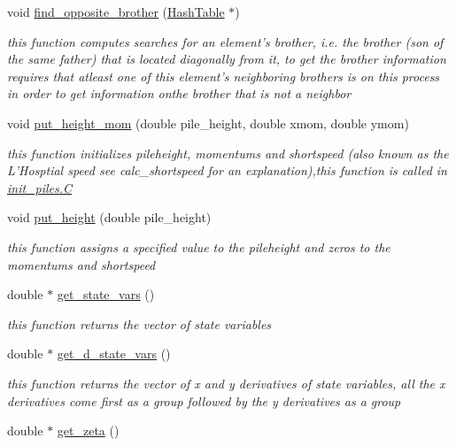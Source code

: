 \begin{CompactItemize}
void \hyperlink{classElement_a62}{find\_\-opposite\_\-brother} (\hyperlink{classHashTable}{Hash\-Table} $\ast$)
\begin{CompactList}\small\item\em this function computes searches for an element's brother, i.e. the brother (son of the same father) that is located diagonally from it, to get the brother information requires that atleast one of this element's neighboring brothers is on this process in order to get information onthe brother that is not a neighbor \item\end{CompactList}\item 
void \hyperlink{classElement_a63}{put\_\-height\_\-mom} (double pile\_\-height, double xmom, double ymom)
\begin{CompactList}\small\item\em this function initializes pileheight, momentums and shortspeed (also known as the L'Hosptial speed see calc\_\-shortspeed for an explanation),this function is called in \hyperlink{constant_8h_a21}{init\_\-piles.C} \item\end{CompactList}\item 
void \hyperlink{classElement_a64}{put\_\-height} (double pile\_\-height)
\begin{CompactList}\small\item\em this function assigns a specified value to the pileheight and zeros to the momentums and shortspeed \item\end{CompactList}\item 
double $\ast$ \hyperlink{classElement_a65}{get\_\-state\_\-vars} ()
\begin{CompactList}\small\item\em this function returns the vector of state variables \item\end{CompactList}\item 
double $\ast$ \hyperlink{classElement_a66}{get\_\-d\_\-state\_\-vars} ()
\begin{CompactList}\small\item\em this function returns the vector of x and y derivatives of state variables, all the x derivatives come first as a group followed by the y derivatives as a group \item\end{CompactList}\item 
double $\ast$ \hyperlink{classElement_a67}{get\_\-zeta} ()

\end{CompactItemize}
